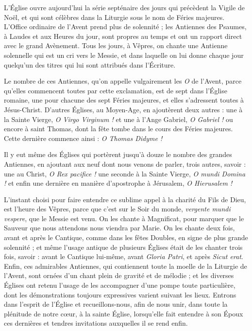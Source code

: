 \documentclass[%
fontsize=10%
,a6paper%
,DIV=15%
]{scrartcl}
\title{\centrer{Grandes Antiennes de l'Avent}}
\author{ou Antiennes O}
\date{du 17 au 23 décembre}
\begin{document}
\newcommand{\ligne}[2]{
\begin{center}
\greseparator{#1}{#2}
\end{center}
}
\thispagestyle{empty}
\maketitle
\thispagestyle{empty}

L’Église ouvre aujourd’hui la série septénaire des jours qui précèdent la Vigile de Noël, et qui sont célèbres dans la Liturgie sous le nom de Féries majeures. L’Office ordinaire de l’Avent prend plus de solennité ; les Antiennes des Psaumes, à Laudes et aux Heures du jour, sont propres au temps et ont un rapport direct avec le grand Avènement. Tous les jours, à Vêpres, on chante une Antienne solennelle qui est un cri vers le Messie, et dans laquelle on lui donne chaque jour quelqu’un des titres qui lui sont attribués dans l’Écriture.

Le nombre de ces Antiennes, qu’on appelle vulgairement les \emph{O} de l’Avent, parce qu’elles commencent toutes par cette exclamation, est de sept dans l’Église romaine, une pour chacune des sept Féries majeures, et elles s’adressent toutes à Jésus-Christ. D’autres Églises, au Moyen-Age, en ajoutèrent deux autres : une à la Sainte Vierge, \emph{O Virgo Virginum !} et une à l’Ange Gabriel, \emph{O Gabriel !} ou encore à saint Thomas, dont la fête tombe dans le cours des Féries majeures. Cette dernière commence ainsi : \emph{O Thomas Didyme !}

Il y eut même des Églises qui portèrent jusqu’à douze le nombre des grandes Antiennes, en ajoutant aux neuf dont nous venons de parler, trois autres, savoir : une au Christ, \emph{O Rex pacifice !} une seconde à la Sainte Vierge, \emph{O mundi Domina !} et enfin une dernière en manière d’apostrophe à Jérusalem, \emph{O Hierusalem !}

L’instant choisi pour faire entendre ce sublime appel à la charité du Fils de Dieu, est l’heure des Vêpres, parce que c’est sur le Soir du monde, \emph{vergente mundi vespere}, que le Messie est venu. On les chante à Magnificat, pour marquer que le Sauveur que nous attendons nous viendra par Marie. On les chante deux fois, avant et après le Cantique, comme dans les fêtes Doubles, en signe de plus grande solennité ; et même l’usage antique de plusieurs Églises était de les chanter trois fois, savoir : avant le Cantique lui-même, avant \emph{Gloria Patri}, et après \emph{Sicut erat}. Enfin, ces admirables Antiennes, qui contiennent toute la moelle de la Liturgie de l’Avent, sont ornées d’un chant plein de gravité et de mélodie ; et les diverses Églises ont retenu l’usage de les accompagner d’une pompe toute particulière, dont les démonstrations toujours expressives varient suivant les lieux. Entrons dans l’esprit de l’Église et recueillons-nous, afin de nous unir, dans toute la plénitude de notre cœur, à la sainte Église, lorsqu’elle fait entendre à son Époux ces dernières et tendres invitations auxquelles il se rend enfin.
\end{document}
